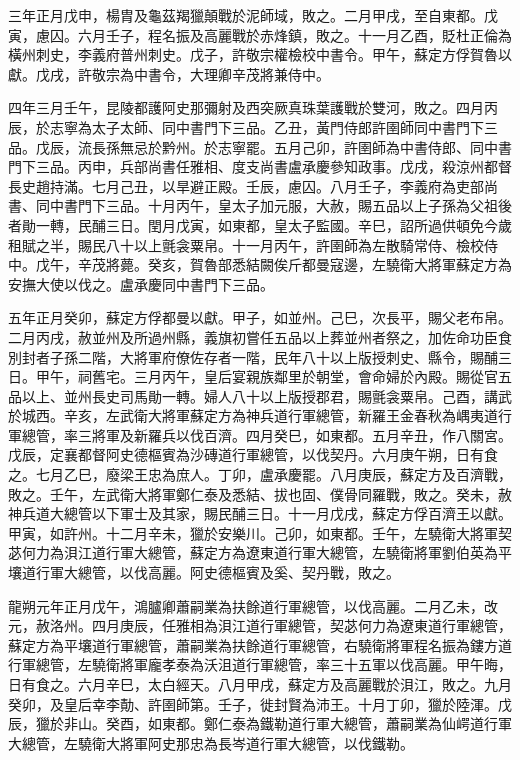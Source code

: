 \begin{pinyinscope}
 三年正月戊申，楊胄及龜茲羯獵顛戰於泥師域，敗之。二月甲戌，至自東都。戊寅，慮囚。六月壬子，程名振及高麗戰於赤烽鎮，敗之。十一月乙酉，貶杜正倫為橫州刺史，李義府普州刺史。戊子，許敬宗權檢校中書令。甲午，蘇定方俘賀魯以獻。戊戌，許敬宗為中書令，大理卿辛茂將兼侍中。



 四年三月壬午，昆陵都護阿史那彌射及西突厥真珠葉護戰於雙河，敗之。四月丙辰，於志寧為太子太師、同中書門下三品。乙丑，黃門侍郎許圉師同中書門下三品。戊辰，流長孫無忌於黔州。於志寧罷。五月己卯，許圉師為中書侍郎、同中書門下三品。丙申，兵部尚書任雅相、度支尚書盧承慶參知政事。戊戌，殺涼州都督長史趙持滿。七月己丑，以旱避正殿。壬辰，慮囚。八月壬子，李義府為吏部尚書、同中書門下三品。十月丙午，皇太子加元服，大赦，賜五品以上子孫為父祖後者勛一轉，民酺三日。閏月戊寅，如東都，皇太子監國。辛巳，詔所過供頓免今歲租賦之半，賜民八十以上氈衾粟帛。十一月丙午，許圉師為左散騎常侍、檢校侍中。戊午，辛茂將薨。癸亥，賀魯部悉結闕俟斤都曼寇邊，左驍衛大將軍蘇定方為安撫大使以伐之。盧承慶同中書門下三品。



 五年正月癸卯，蘇定方俘都曼以獻。甲子，如並州。己巳，次長平，賜父老布帛。二月丙戌，赦並州及所過州縣，義旗初嘗任五品以上葬並州者祭之，加佐命功臣食別封者子孫二階，大將軍府僚佐存者一階，民年八十以上版授刺史、縣令，賜酺三日。甲午，祠舊宅。三月丙午，皇后宴親族鄰里於朝堂，會命婦於內殿。賜從官五品以上、並州長史司馬勛一轉。婦人八十以上版授郡君，賜氈衾粟帛。己酉，講武於城西。辛亥，左武衛大將軍蘇定方為神兵道行軍總管，新羅王金春秋為嵎夷道行軍總管，率三將軍及新羅兵以伐百濟。四月癸巳，如東都。五月辛丑，作八關宮。戊辰，定襄都督阿史德樞賓為沙磚道行軍總管，以伐契丹。六月庚午朔，日有食之。七月乙巳，廢梁王忠為庶人。丁卯，盧承慶罷。八月庚辰，蘇定方及百濟戰，敗之。壬午，左武衛大將軍鄭仁泰及悉結、拔也固、僕骨同羅戰，敗之。癸未，赦神兵道大總管以下軍士及其家，賜民酺三日。十一月戊戌，蘇定方俘百濟王以獻。甲寅，如許州。十二月辛未，獵於安樂川。己卯，如東都。壬午，左驍衛大將軍契苾何力為浿江道行軍大總管，蘇定方為遼東道行軍大總管，左驍衛將軍劉伯英為平壤道行軍大總管，以伐高麗。阿史德樞賓及奚、契丹戰，敗之。



 龍朔元年正月戊午，鴻臚卿蕭嗣業為扶餘道行軍總管，以伐高麗。二月乙未，改元，赦洛州。四月庚辰，任雅相為浿江道行軍總管，契苾何力為遼東道行軍總管，蘇定方為平壤道行軍總管，蕭嗣業為扶餘道行軍總管，右驍衛將軍程名振為鏤方道行軍總管，左驍衛將軍龐孝泰為沃沮道行軍總管，率三十五軍以伐高麗。甲午晦，日有食之。六月辛巳，太白經天。八月甲戌，蘇定方及高麗戰於浿江，敗之。九月癸卯，及皇后幸李勣、許圉師第。壬子，徙封賢為沛王。十月丁卯，獵於陸渾。戊辰，獵於非山。癸酉，如東都。鄭仁泰為鐵勒道行軍大總管，蕭嗣業為仙崿道行軍大總管，左驍衛大將軍阿史那忠為長岑道行軍大總管，以伐鐵勒。




\end{pinyinscope}
